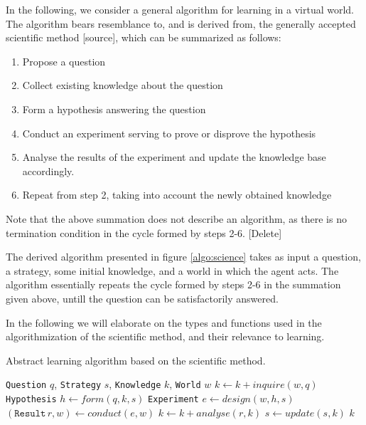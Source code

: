 \documentclass[master.tex]{subfiles}
\begin{document}
In the following, we consider a general algorithm for learning in a virtual world. The algorithm bears resemblance to, and is derived from, the generally accepted scientific method [source], which can be summarized as follows:

\begin{enumerate}
    \item Propose a question
    \item Collect existing knowledge about the question
    \item Form a hypothesis answering the question
    \item Conduct an experiment serving to prove or disprove the hypothesis
    \item Analyse the results of the experiment and update the knowledge base accordingly.
    \item Repeat from step 2, taking into account the newly obtained knowledge
\end{enumerate}

Note that the above summation does not describe an algorithm, as there is no termination condition in the cycle formed by steps 2-6. [Delete]

The derived algorithm presented in figure \ref{algo:science} takes as input a question, a strategy, some initial knowledge, and a world in which the agent acts. The algorithm essentially repeats the cycle formed by steps 2-6 in the summation given above, untill the question can be satisfactorily answered.

In the following we will elaborate on the types and functions used in the algorithmization of the scientific method, and their relevance to learning.

\begin{algorithm}
    \caption{Abstract learning algorithm based on the scientific method.}
    \label{algo:science}

    \begin{algorithmic}
         {\texttt{Question} $q$, \texttt{Strategy} $s$, \texttt{Knowledge} $k$, \texttt{World} $w$}
                \State $k \gets k + inquire(w, q)$
                \State \texttt{Hypothesis} $h \gets form(q, k, s)$
                \State \texttt{Experiment} $e \gets design(w, h, s)$
                \State $(\texttt{Result} \, r, w) \gets conduct(e, w)$
                \State $k \gets k + analyse(r, k)$
                \State $s \gets update(s, k)$
            \EndWhile
            \State \Return $k$
        \EndFunction
    \end{algorithmic}
\end{algorithm}
\end{document}
